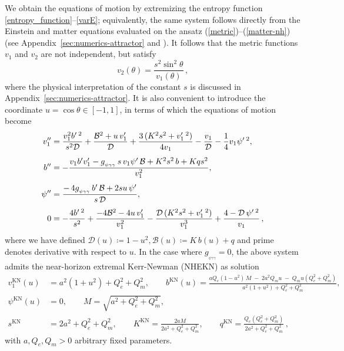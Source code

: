 \documentclass[11pt]{article}
\newcommand{\eqn}[1]{(\ref{#1})}
\numberwithin{equation}{section} %
\begin{document}
We obtain the equations of motion by extremizing the entropy function   {\eqref{entropy_function}--\eqref{varE}; equivalently, the same system follows directly from the Einstein and matter equations evaluated on the ansatz \eqn{metric}--\eqn{matter-nh} (see Appendix~\ref{sec:numerics-attractor} and}  \cite{Astefanesei:2006dd}).   {It follows that}  the metric functions $v_1$ and $v_2$ are not independent, but satisfy
 \begin{equation}
v_2(\theta)=\frac{s^2\sin^2 \theta}{v_1(\theta)}\,,
\end{equation}
where the physical   {interpretation}  of the constant $s$ is   {discussed}  in Appendix~\ref{sec:numerics-attractor}. It is also convenient to introduce the  coordinate $u=\cos\theta\in[-1,1]$, {in terms of which}  the equations of motion   {become}
\begin{subequations}\label{eq:NH-EMA}
\allowdisplaybreaks
\begin{align}
v_{1}'' &=
 \frac{v_{1}^{2} b'\, ^{2}}{s^{2}\mathcal{D}}
 +\frac{\mathcal{B}^{2}+u\,v_{1}'}{\mathcal{D}}
 +\frac{3\,(K^{2}s^{2}+v_{1}'\,^{2})}{4v_{1}}
 -\frac{v_{1}}{\mathcal{D}}
 -\frac{1}{4}v_{1}\psi'\,^{2}\label{eq:NH-EMA-v1},\\[4pt]
b'' &= -\frac{v_{1} b' v_{1}' - g_{_{\psi\gamma\gamma}}\,s\,v_{1}\psi'\,\mathcal{B}
               +K^{2}s^{2}\, b + K q s^{2}}{v_{1}^{2}},\\[4pt]
\psi'' &= \frac{-\,4 g_{_{\psi\gamma\gamma}}\, b'\,\mathcal{B} + 2 s u\,\psi'}{s\,\mathcal{D}},\label{eq:NH-EMA-phi}\\[4pt]
0 &= -\frac{4 b'\,^{2}}{s^{2}}
     +\frac{-4\mathcal{B}^{2}-4u\,v_{1}'}{v_{1}^{2}}
     -\frac{\mathcal{D}\,(K^{2}s^{2}+v_{1}'\,^{2})}{v_{1}^{3}}
     +\frac{4 - \mathcal{D}\,\psi'\,^{2}}{v_{1}}\,,\label{eq:NH-EMA-cons}
\end{align}
\end{subequations}
where we have defined $\mathcal{D}(u)\coloneqq 1-u^{2}, \mathcal{B}(u)\coloneqq K\,b(u)+q$ and prime denotes derivative with respect to $u$. In the case where $g_{_{\psi\gamma\gamma}}=0$, the above system admits the near-horizon extremal Kerr-Newman (NHEKN) \cite{Newman:1965my,Bardeen:1999px}  as solution 
%
\begin{equation}
  \begin{aligned}\label{NHEKNDEF}
v_{1}^{\scriptscriptstyle\mathrm{{KN}}}(u) &= a^{2}(1+u^{2}) + Q_{e}^{2} + Q_{m}^{2},\qquad
b^{\scriptscriptstyle\mathrm{KN}}(u) = \frac{a Q_{e}(1-u^{2})\,M \; -\; 2 a^{2} Q_{m} u \; -\; Q_{m} u (Q_{e}^{2}+Q_{m}^{2})}{a^{2}(1+u^{2}) + Q_{e}^{2} + Q_{m}^{2}},\\
\psi^{\scriptscriptstyle\mathrm{KN}}(u) &= 0,\qquad
M = \sqrt{a^{2}+Q_{e}^{2}+Q_{m}^{2}},\\
s^{\scriptscriptstyle\mathrm{KN}}&= 2 a^{2}+Q_{e}^{2}+Q_{m}^{2},\qquad
K^{\scriptscriptstyle\mathrm{KN}}= \frac{2 a M}{2 a^{2}+Q_{e}^{2}+Q_{m}^{2}},\qquad
q^{\scriptscriptstyle\mathrm{KN}}= \frac{Q_{e}(Q_{e}^{2}+Q_{m}^{2})}{2 a^{2}+Q_{e}^{2}+Q_{m}^{2}}\,,
\end{aligned} 
\end{equation}
%
with $a,Q_e,Q_m>0$ arbitrary fixed parameters.
\end{document}
